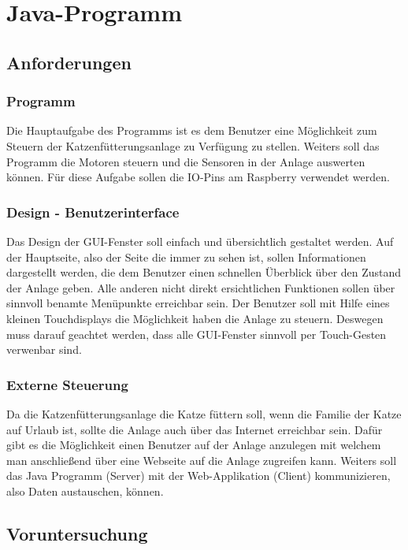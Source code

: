 
\chapter{Java-Programm}
\label{sec:java-programm}

\section{Anforderungen}
\subsection{Programm}
Die Hauptaufgabe des Programms ist es dem Benutzer eine Möglichkeit zum Steuern der Katzenfütterungsanlage zu Verfügung zu stellen. Weiters soll das Programm die Motoren steuern und die Sensoren in der Anlage auswerten können. Für diese Aufgabe sollen die IO-Pins am Raspberry verwendet werden.
\subsection{Design - Benutzerinterface}
Das Design der GUI-Fenster soll einfach und übersichtlich gestaltet werden. Auf der Hauptseite, also der Seite die immer zu sehen ist, sollen Informationen dargestellt werden, die dem Benutzer einen schnellen Überblick über den Zustand der Anlage geben. Alle anderen nicht direkt ersichtlichen Funktionen sollen über sinnvoll benamte Menüpunkte erreichbar sein.
Der Benutzer soll mit Hilfe eines kleinen Touchdisplays die Möglichkeit haben die Anlage zu steuern. Deswegen muss darauf geachtet werden, dass alle GUI-Fenster sinnvoll per Touch-Gesten verwenbar sind.
\subsection{Externe Steuerung}
Da die Katzenfütterungsanlage die Katze füttern soll, wenn die Familie der Katze auf Urlaub ist, sollte die Anlage auch über das Internet erreichbar sein. Dafür gibt es die Möglichkeit einen Benutzer auf der Anlage anzulegen mit welchem man anschließend über eine Webseite auf die Anlage zugreifen kann. Weiters soll das Java Programm (Server) mit der Web-Applikation (Client) kommunizieren, also Daten austauschen, können.

\newpage

\section{Voruntersuchung}
